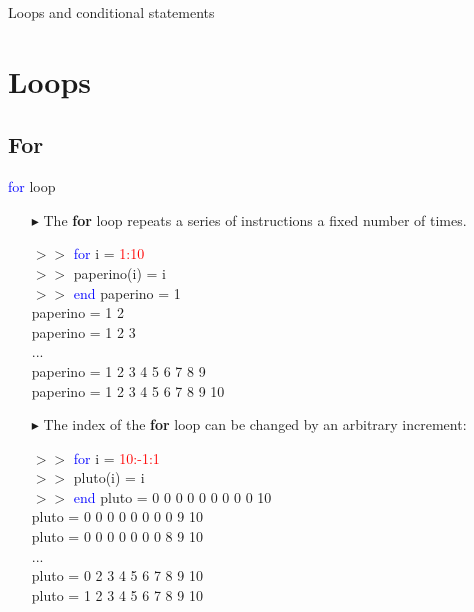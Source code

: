 \documentclass[xcolor={dvipsnames,rgb}, aspectratio=169]{beamer}
\begin{document}
{%
   \begin{frame}[standout]
      Loops and conditional statements
   \end{frame}
}

\section{Loops}
\subsection{For}
\begin{frame}{\textcolor{blue}{for} loop}
\begin{itemize}
   \item[$\blacktriangleright$] The \textbf{for} loop repeats a series of instructions a
      \alert{fixed number of times}.
   \begin{tcolorbox}[colback=white,colframe=bluepoli]
      $>>$ \textcolor{blue}{for} i = \textcolor{red}{1:10}\\
      $>>$ \hspace{1em}paperino(i) = i \\
      $>>$ \textcolor{blue}{end}
      \tcblower
      paperino = 1 \\
      paperino = 1 2\\
      paperino = 1 2 3\\
      ... \\
      paperino = 1 2 3 4 5 6 7 8 9\\
      paperino = 1 2 3 4 5 6 7 8 9 10
   \end{tcolorbox}
\end{itemize}
\end{frame}

\begin{frame}{}
\begin{itemize}
   \item[$\blacktriangleright$] The index of the \textbf{for} loop can be changed by an
      \alert{arbitrary increment}:
   \begin{tcolorbox}[colback=white,colframe=bluepoli]
      $>>$ \textcolor{blue}{for} i = \textcolor{red}{10:-1:1}\\
      $>>$ \hspace{1em}pluto(i) = i\\
      $>>$ \textcolor{blue}{end}
      \tcblower
      pluto = 0 0 0 0 0 0 0 0 0 10 \\
      pluto = 0 0 0 0 0 0 0 0 9 10 \\
      pluto = 0 0 0 0 0 0 0 8 9 10 \\
      ... \\
      pluto = 0 2 3 4 5 6 7 8 9 10 \\
      pluto = 1 2 3 4 5 6 7 8 9 10 \\
   \end{tcolorbox}
\end{itemize}
\end{frame}
\end{document}
